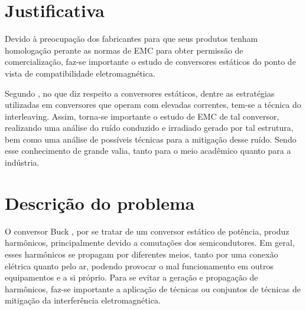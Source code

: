     \section{Justificativa}
        
        
        Devido à preocupação dos fabricantes para que seus produtos tenham homologação perante as normas de EMC para obter permissão de comercialização, faz-se importante o estudo de conversores estáticos do ponto de vista de compatibilidade eletromagnética.
        
        Segundo , no que diz respeito a conversores estáticos, dentre as estratégias utilizadas em conversores que operam com elevadas correntes, tem-se a técnica do interleaving. Assim, torna-se importante o estudo de EMC de tal conversor, realizando uma análise do ruído conduzido e irradiado gerado por tal estrutura, bem como uma análise de possíveis técnicas para a mitigação desse ruído.
        Sendo esse conhecimento de grande valia, tanto para o meio acadêmico quanto para a indústria.
        
    \section{Descrição do problema}
        
        O conversor Buck \interleaved, por se tratar de um conversor estático de potência, produz harmônicos, principalmente devido a comutações dos semicondutores. Em geral, esses harmônicos se propagam por diferentes meios, tanto por uma conexão elétrica quanto pelo ar, podendo provocar o mal funcionamento em outros equipamentos e a si próprio. Para se evitar a geração e propagação de harmônicos, faz-se importante a aplicação de técnicas ou conjuntos de técnicas de mitigação da interferência eletromagnética.
        
        
